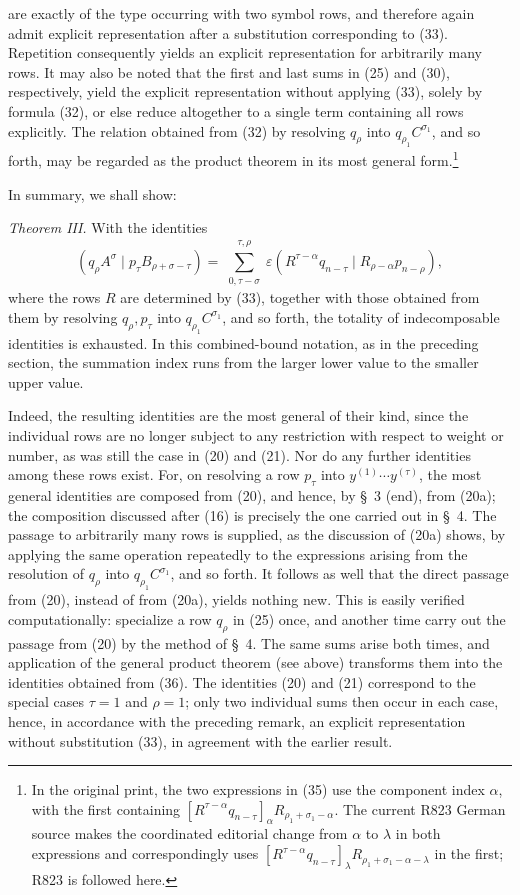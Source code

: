 \documentclass[10pt]{article}
\newcommand{\pair}[2]{(#1\mid #2)}
\newcommand{\eps}{\varepsilon}
\begin{document}
are exactly of the type occurring with two symbol rows, and therefore again
admit explicit representation after a substitution corresponding to (33).
Repetition consequently yields an explicit representation for arbitrarily
many rows. It may also be noted that the first and last sums in (25) and
(30), respectively, yield the explicit representation without applying
(33), solely by formula (32), or else reduce altogether to a single term
containing all rows explicitly. The relation obtained from (32) by resolving
$q_\rho$ into $q_{\rho_1}C^{\sigma_1}$, and so forth, may be regarded as the
product theorem in its most general form.\footnote{In the original print,
the two expressions in (35) use the component index $\alpha$, with the first
containing
$[R^{\tau-\alpha}q_{n-\tau}]_\alpha
R_{\rho_1+\sigma_1-\alpha}$. The current R823 German source makes the
coordinated editorial change from $\alpha$ to $\lambda$ in both expressions
and correspondingly uses
$[R^{\tau-\alpha}q_{n-\tau}]_\lambda
R_{\rho_1+\sigma_1-\alpha-\lambda}$ in the first; R823 is followed here.}

In summary, we shall show:

\emph{Theorem III.} With the identities
\begin{equation}
 \pair{q_\rho A^\sigma}{p_\tau B_{\rho+\sigma-\tau}}
 =\sum_{\substack{0,\tau-\sigma}}^{\substack{\tau,\rho}}
 \eps\pair{R^{\tau-\alpha}q_{n-\tau}}
 {R_{\rho-\alpha}p_{n-\rho}},
\tag{36}
\end{equation}
where the rows $R$ are determined by (33), together with those obtained from
them by resolving $q_\rho,p_\tau$ into $q_{\rho_1}C^{\sigma_1}$, and so
forth, the totality of indecomposable identities is exhausted. In this
combined-bound notation, as in the preceding section, the summation index
runs from the larger lower value to the smaller upper value.

Indeed, the resulting identities are the most general of their kind, since
the individual rows are no longer subject to any restriction with respect to
weight or number, as was still the case in (20) and (21). Nor do any further
identities among these rows exist. For, on resolving a row $p_\tau$ into
$y^{(1)}\cdots y^{(\tau)}$, the most general identities are composed from
(20), and hence, by \S\ 3 (end), from (20a); the composition discussed after
(16) is precisely the one carried out in \S\ 4. The passage to arbitrarily
many rows is supplied, as the discussion of (20a) shows, by applying the
same operation repeatedly to the expressions arising from the resolution of
$q_\rho$ into $q_{\rho_1}C^{\sigma_1}$, and so forth. It follows as well that
the direct passage from (20), instead of from (20a), yields nothing new. This
is easily verified computationally: specialize a row $q_\rho$ in (25) once,
and another time carry out the passage from (20) by the method of \S\ 4. The
same sums arise both times, and application of the general product theorem
(see above) transforms them into the identities obtained from (36). The
identities (20) and (21) correspond to the special cases $\tau=1$ and
$\rho=1$; only two individual sums then occur in each case, hence, in
accordance with the preceding remark, an explicit representation without
substitution (33), in agreement with the earlier result.
\end{document}

